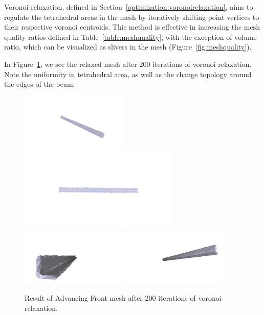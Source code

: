 \documentclass[12pt]{drexelthesis}
\begin{document}
Voronoi relaxation, defined in Section~\ref{optimization:voronoirelaxation}, aims to regulate the tetrahedral areas in the mesh by iteratively shifting point vertices to their respective voronoi centroids. This method is effective in increasing the mesh quality ratios defined in Table~\ref{table:meshquality}, with the exception of volume ratio, which can be visualized as slivers in the mesh (Figure~\ref{fig:meshquality}).

In Figure~\ref{zeronoise:advancedlloyd}, we see the relaxed mesh after 200 iterations of voronoi relaxation. Note the uniformity in tetrahedral area, as well as the change topology around the edges of the beam.

\begin{figure}[!ht]
	\centering
		\includegraphics[trim={6in 2in 3in 2in},clip,width=2in]{simulated-lab-scan/0noise/optimized/advancedfrontLloyd30s200it00.png}
		\includegraphics[trim={3in 2in 3in 2in}, clip, width=3in]{simulated-lab-scan/0noise/optimized/advancedfrontLloyd30s200it01.png}
		\includegraphics[trim={1in 1in 2in 2in}, clip, width=2in]{simulated-lab-scan/0noise/optimized/advancedfrontLloyd30s200it02.png}
		\includegraphics[trim={1in 1in 1in 2in}, clip, width=2in]{simulated-lab-scan/0noise/optimized/advancedfrontLloyd30s200it03.png}
		\caption[Advancing Front mesh after 200 iterations of voronoi relaxation]{\centering  Result of Advancing Front mesh after 200 iterations of voronoi relaxation.}
	\label{zeronoise:advancedlloyd}
\end{figure}
\end{document}
